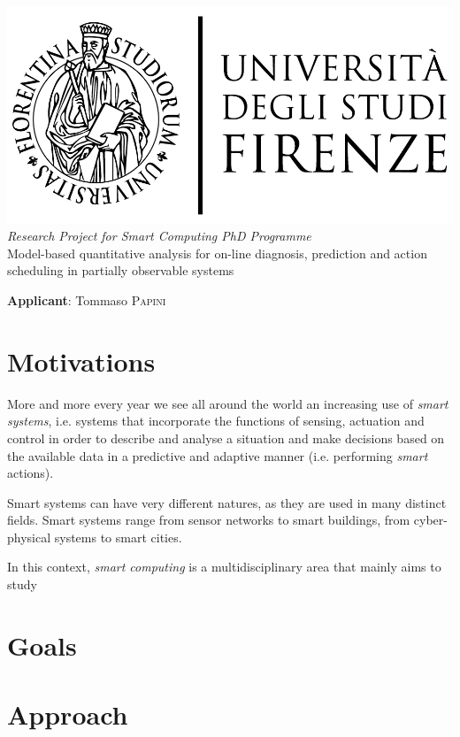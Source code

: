 \documentclass{article}
\begin{document}
    
    \begin{center}
        \includegraphics[scale=0.2]{logo_unifi.jpg}\\[4cm]
        \textit{Research Project for Smart Computing PhD Programme}\\[0.3cm]
        {\Huge Model-based quantitative analysis for on-line diagnosis, prediction and action scheduling in partially observable systems}
    \end{center}
    
    \vfill
    
    \textbf{Applicant}: Tommaso \textsc{Papini}
    
    \clearpage
    
    \section*{Motivations}
    
        More and more every year we see all around the world an increasing use of \textit{smart systems}, i.e. systems that incorporate the functions of sensing, actuation and control in order to describe and analyse a situation and make decisions based on the available data in a predictive and adaptive manner (i.e. performing \textit{smart} actions).
        
        Smart systems can have very different natures, as they are used in many distinct fields. Smart systems range from sensor networks to smart buildings, from cyber-physical systems to smart cities.
        
        In this context, \textit{smart computing} is a multidisciplinary area that mainly aims to study
        
    \section*{Goals}
    
    
    \section*{Approach}
    
    \clearpage
    
	\nocite{*}
	
	
\end{document}
